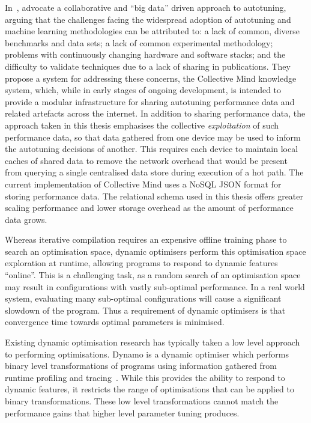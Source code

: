 In~\cite{Saclay2010,Memon2013,Fursin2014}, \citeauthor{Fursin2014} advocate a collaborative and ``big data'' driven approach to autotuning, arguing that the challenges facing the widespread adoption of autotuning and machine learning methodologies can be attributed to: a lack of common, diverse benchmarks and data sets; a lack of common experimental methodology; problems with continuously changing hardware and software stacks; and the difficulty to validate techniques due to a lack of sharing in publications. They propose a system for addressing these concerns, the Collective Mind knowledge system, which, while in early stages of ongoing development, is intended to provide a modular infrastructure for sharing autotuning performance data and related artefacts across the internet. In addition to sharing performance data, the approach taken in this thesis emphasises the collective \emph{exploitation} of such performance data, so that data gathered from one device may be used to inform the autotuning decisions of another. This requires each device to maintain local caches of shared data to remove the network overhead that would be present from querying a single centralised data store during execution of a hot path. The current implementation of Collective Mind uses a NoSQL JSON format for storing performance data. The relational schema used in this thesis offers greater scaling performance and lower storage overhead as the amount of performance data grows.

Whereas iterative compilation requires an expensive offline training
phase to search an optimisation space, dynamic optimisers perform this
optimisation space exploration at runtime, allowing programs to
respond to dynamic features ``online''. This is a challenging task, as
a random search of an optimisation space may result in configurations
with vastly sub-optimal performance. In a real world system, evaluating
many sub-optimal configurations will cause a significant slowdown of
the program. Thus a requirement of dynamic optimisers is that
convergence time towards optimal parameters is minimised.

Existing dynamic optimisation research has typically taken a low level
approach to performing optimisations. Dynamo is a dynamic optimiser
which performs binary level transformations of programs using
information gathered from runtime profiling and
tracing~\cite{Bala2000}. While this provides the ability to respond to
dynamic features, it restricts the range of optimisations that can be
applied to binary transformations. These low level transformations
cannot match the performance gains that higher level parameter tuning
produces.


